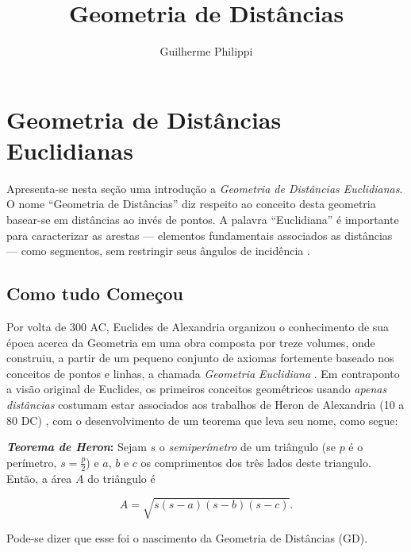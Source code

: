 \documentclass[a4paper,12pt]{article}
\title{Geometria de Distâncias}
\author{Guilherme Philippi}
\begin{document}
\maketitle
\tableofcontents

\section{Geometria de Distâncias Euclidianas}
Apresenta-se nesta seção uma introdução a \textit{Geometria de Distâncias Euclidianas}. O nome ``Geometria de Distâncias'' diz respeito ao conceito desta geometria basear-se em distâncias ao invés de pontos. A palavra ``Euclidiana'' é importante para caracterizar as arestas --- elementos fundamentais associados as distâncias --- como segmentos, sem restringir seus ângulos de incidência \cite{libertiEDG}.

\subsection{Como tudo Começou}

Por volta de 300 AC, Euclides de Alexandria organizou o conhecimento de sua época acerca da Geometria em uma obra composta por treze volumes, onde construiu, a partir de um pequeno conjunto de axiomas fortemente baseado nos conceitos de pontos e linhas, a chamada \textit{Geometria Euclidiana} \cite{elementosEuclides}. Em contraponto a visão original de Euclides, os primeiros conceitos geométricos usando \textit{apenas distâncias} costumam estar associados aos trabalhos de Heron de Alexandria (10 a 80 DC) \cite{libertiEDG}, com o desenvolvimento de um teorema que leva seu nome, como segue: 
\begin{center}
	\begin{minipage}{0.9 \linewidth}
		\textbf{\textit{Teorema de Heron}:} Sejam $s$ o \textit{semiperímetro} de um triângulo (se $p$ é o perímetro, $s = \frac{p}{2}$) e $a$, $b$ e $c$ os comprimentos dos três lados deste triangulo. Então, a área $A$ do triângulo é
		
		\begin{equation}\tag{Fórmula de Heron}
		A = \sqrt{s(s-a)(s-b)(s-c)}.
		\label{eq:heron}
		\end{equation}
	\end{minipage}
\end{center} 
Pode-se dizer que esse foi o nascimento da Geometria de Distâncias (GD).
\end{document}
